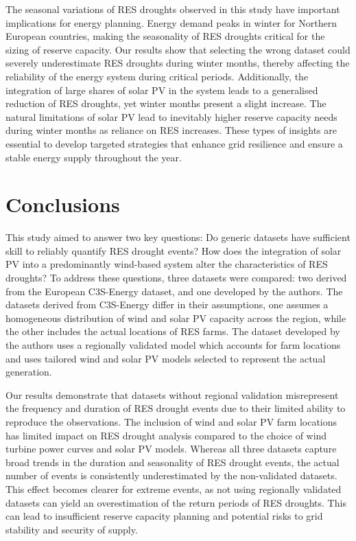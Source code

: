 \documentclass[preprint, 12pt]{elsarticle}
\begin{document}
The seasonal variations of RES droughts observed in this study have important implications for energy planning. Energy demand peaks in winter for Northern European countries, making the seasonality of RES droughts critical for the sizing of reserve capacity. Our results show that selecting the wrong dataset could severely underestimate RES droughts during winter months, thereby affecting the reliability of the energy system during critical periods. Additionally, the integration of large shares of solar PV in the system leads to a generalised reduction of RES droughts, yet winter months present a slight increase. The natural limitations of solar PV lead to inevitably higher reserve capacity needs during winter months as reliance on RES increases. These types of insights are essential to develop targeted strategies that enhance grid resilience and ensure a stable energy supply throughout the year.


\section{Conclusions}
\label{sec:conclusions}

This study aimed to answer two key questions: Do generic datasets have sufficient skill to reliably quantify RES drought events? How does the integration of solar PV into a predominantly wind-based system alter the characteristics of RES droughts? To address these questions, three datasets were compared: two derived from the European C3S-Energy dataset, and one developed by the authors. The datasets derived from C3S-Energy differ in their assumptions, one assumes a homogeneous distribution of wind and solar PV capacity across the region, while the other includes the actual locations of RES farms. The dataset developed by the authors uses a regionally validated model which accounts for farm locations and uses tailored wind and solar PV models selected to represent the actual generation.

Our results demonstrate that datasets without regional validation misrepresent the frequency and duration of RES drought events due to their limited ability to reproduce the observations. The inclusion of wind and solar PV farm locations has limited impact on RES drought analysis compared to the choice of wind turbine power curves and solar PV models. Whereas all three datasets capture broad trends in the duration and seasonality of RES drought events, the actual number of events is consistently underestimated by the non-validated datasets. This effect becomes clearer for extreme events, as not using regionally validated datasets can yield an overestimation of the return periods of RES droughts. This can lead to insufficient reserve capacity planning and potential risks to grid stability and security of supply.
\end{document}
